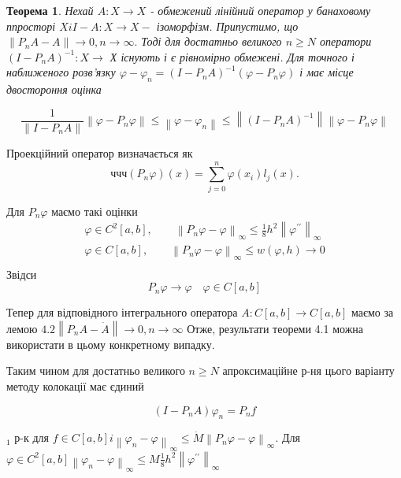 \documentclass[14pt,a4paper]{extarticle}
\newcounter{e}
\newtheorem{theorem}{Теорема}[section]
\numberwithin{equation}{section}
\begin{document}
	\begin{theorem}
		Нехай $A: X \rightarrow X$ - обмежений лінійний оператор у банаховому ппросторі $X i I-A: X \rightarrow X-$ ізоморфізм. Припустимо, що $\left\|P_{n} A-A\right\| \rightarrow 0, n \rightarrow \infty .$ Тоді для достатньо великого $n \geq N$ оператори $\left(I-P_{n} A\right)^{-1}: X \rightarrow$ Х існують і є рівномірно обмежені. Для точного і наближеного розв'язку $\varphi-\varphi_{n}=\left(I-P_{n} A\right)^{-1}\left(\varphi-P_{n} \varphi\right)$ і має місце двостороння оцінка
	\end{theorem} 

 $$
 \frac{1}{\left\|I-P_{n} A\right\|}\left\|\varphi-P_{n} \varphi\right\| \leq\left\|\varphi-\varphi_{n}\right\| \leq\left\|\left(I-P_{n} A\right)^{-1}\right\|\left\|\varphi-P_{n} \varphi\right\|
 $$
 
 
Проекційний оператор визначається як
 $$ччч
 \left(P_{n} \varphi\right)(x)= \sum_{j=0}^{n} \varphi\left(x_{i}\right) l_{j}(x) .
 $$
 
 Для $P_{n} \varphi$ маємо такі оцінки 
 $$
 \begin{array}{l}
 	\displaystyle
	\varphi \in C^{2}[a, b], \quad \quad \left\|P_{n} \varphi-\varphi\right\|_{\infty} \leq \frac{1}{8} h^{2}\left\|\varphi^{\prime \prime}\right\|_{\infty}  
	\\[0.3cm]
 	
 	\displaystyle
	\varphi \in C[a, b], \quad \quad \left\|P_{n} \varphi-\varphi\right\|_{\infty} \leq w(\varphi, h) \rightarrow 0
	\\[0.3cm]	
\end{array}
 $$
 Звідси 
 $$ 
 P_{n} \varphi \rightarrow \varphi  \quad  \varphi \in C[a, b]
 $$
 
 Тепер для відповідного інтегрального оператора $A: C[a, b] \rightarrow C[a, b]$ маємо за лемою $4.2\left\|P_{n} A-\dot{A}\right\| \rightarrow 0, n \rightarrow \infty$
 Отже, результати теореми 4.1 можна використати в цьому конкретному випадку. 
 

 Таким чином для достатньо великого $n \geq N$ апроксимаційне р-ня цього варіанту методу колокації  має єдиний
 
\begin{equation}
\left(I-P_{n} A\right) \varphi_{n}=P_{n} f
\end{equation}
 
 $_{1}$ р-к для $f \in C[a, b] i\left\|\varphi_{n}-\varphi\right\|_{\infty} \leq \dot{M}\left\|P_{n} \varphi-\varphi\right\|_{\infty}$. Для
 $\varphi \in C^{2}[a, b]\left\|\varphi_{n}-\varphi\right\|_{\infty} \leq M \frac{1}{8} h^{2}\left\|\varphi^{\prime \prime}\right\|_{\infty}$
\end{document}
